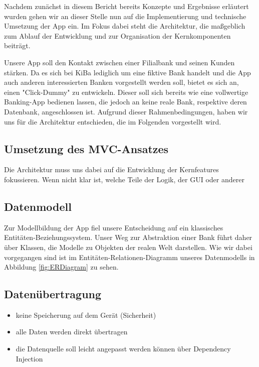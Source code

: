 	Nachdem zunächst in diesem Bericht bereits Konzepte und Ergebnisse erläutert wurden gehen wir an dieser Stelle nun auf die Implementierung und technische Umsetzung der App ein. Im Fokus dabei steht die Architektur, die maßgeblich zum Ablauf der Entwicklung und zur Organisation der Kernkomponenten beiträgt.
	
	Unsere App soll den Kontakt zwischen einer Filialbank und seinen Kunden stärken. Da es sich bei KiBa lediglich um eine fiktive Bank handelt und die App auch anderen interessierten Banken vorgestellt werden soll, bietet es sich an, einen "Click-Dummy" zu entwickeln. Dieser soll sich bereits wie eine vollwertige Banking-App bedienen lassen, die jedoch an keine reale Bank, respektive deren Datenbank, angeschlossen ist. Aufgrund dieser Rahmenbedingungen, haben wir uns für die Architektur entschieden, die im Folgenden vorgestellt wird.

\subsection{Umsetzung des MVC-Ansatzes}
	Die Architektur muss uns dabei auf die Entwicklung der Kernfeatures fokussieren. Wenn nicht klar ist, welche Teile der Logik, der GUI oder anderer 

\subsection{Datenmodell}	
	Zur Modellbildung der App fiel unsere Entscheidung auf ein klassisches Entitäten-Be\-zieh\-ungs\-sys\-tem. Unser Weg zur Abstraktion einer Bank führt daher über Klassen, die Modelle zu Objekten der realen Welt darstellen. Wie wir dabei vorgegangen sind ist im Entitäten-Relationen-Diagramm unseres Datenmodells in Abbildung \ref{fig:ERDiagram} zu sehen.
	
	

\subsection{Datenübertragung}
\begin{itemize}
	\item keine Speicherung auf dem Gerät (Sicherheit)
	\item alle Daten werden direkt übertragen
	\item die Datenquelle soll leicht angepasst werden können über Dependency Injection
\end{itemize}

